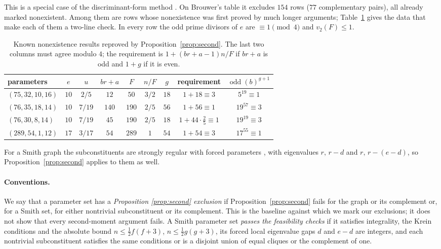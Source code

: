 \documentclass[11pt]{article}
\theoremstyle{definition}
\theoremstyle{remark}
\newcommand{\odd}{\operatorname{odd}}
\begin{document}
This is a special case of the discriminant-form method \cite{BMV,Koval}. On
Brouwer's table it excludes $154$ rows ($77$ complementary pairs), all already
marked nonexistent. Among them are rows whose nonexistence was first proved
by much longer arguments; Table~\ref{tab:known} gives the data that make each
of them a two-line check. In every row the odd prime divisors of $e$ are
$\equiv1\pmod 4$ and $v_2(F)\le1$.
\begin{table}[ht]\small\centering
\caption{Known nonexistence results reproved by
Proposition~\ref{prop:second}. The last two columns must agree modulo $4$;
the requirement is $1+(br+a-1)n/F$ if $br+a$ is odd and $1+g$ if it is
even.}\label{tab:known}
\setlength{\tabcolsep}{5pt}
\begin{tabular}{lcccccccc}\toprule
parameters&$e$&$u$&$br+a$&$F$&$n/F$&$g$&requirement&$\odd(b)^{g+1}$\\\midrule
$(75,32,10,16)$ \cite{AM}&$10$&$2/5$&$12$&$50$&$3/2$&$18$&$1+18\equiv3$&$5^{19}\equiv1$\\
$(76,35,18,14)$ \cite{AM}&$10$&$7/19$&$140$&$190$&$2/5$&$56$&$1+56\equiv1$&$19^{57}\equiv3$\\
$(76,30,8,14)$ \cite{BPR}&$10$&$7/19$&$45$&$190$&$2/5$&$18$&$1+44\cdot\frac25\equiv1$&$19^{19}\equiv3$\\
$(289,54,1,12)$ \cite{BR}&$17$&$3/17$&$54$&$289$&$1$&$54$&$1+54\equiv3$&$17^{55}\equiv1$\\
\bottomrule
\end{tabular}
\end{table} For a Smith graph the subconstituents are strongly regular
with forced parameters \cite{CGS}, with eigenvalues $r,\,r-d$ and
$r,\,r-(e-d)$, so Proposition~\ref{prop:second} applies to them as well.

\paragraph{Conventions.} We say that a parameter set has a \emph{Proposition
\ref{prop:second} exclusion} if Proposition~\ref{prop:second} fails for the
graph or its complement or, for a Smith set, for either nontrivial
subconstituent or its complement. This is the baseline against which we mark our
exclusions; it does not show that every second-moment argument fails. A Smith
parameter set \emph{passes the feasibility checks} if it satisfies
integrality, the Krein conditions and the absolute bound
$n\le\frac12f(f+3)$, $n\le\frac12g(g+3)$, its forced local
eigenvalue gaps $d$ and $e-d$ are integers, and each nontrivial subconstituent
satisfies the same conditions or is a disjoint union of equal cliques or the
complement of one.
\end{document}

